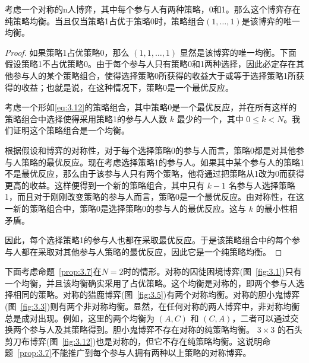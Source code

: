 \begin{proposition}\label{prop:3.7}
    考虑一个对称的n人博弈，其中每个参与人有两种策略，0和1。那么这个博弈存在纯策略均衡。当且仅当策略1占优于策略0时，策略组合$(1, \ldots, 1)$是该博弈的唯一均衡。
\end{proposition}

\begin{proof}
如果策略1占优策略0，那么 \((1,1,\ldots,1)\) 显然是该博弈的唯一均衡。下面假设策略1不占优策略0。由于每个参与人只有策略0和1两种选择，因此必定存在其他参与人的某个策略组合，使得选择策略0所获得的收益大于或等于选择策略1所获得的收益；也就是说，在这种情况下，策略0是一个最优反应。

考虑一个形如\eqref{eq:3.12}的策略组合，其中策略0是一个最优反应，并在所有这样的策略组合中选择使得采用策略1的参与人人数 \(k\) 最少的一个，其中 \(0\leq k<N\)。我们证明这个策略组合是一个均衡。

根据假设和博弈的对称性，对于每个选择策略0的参与人而言，策略0都是对其他参与人策略的最优反应。现在考虑选择策略1的参与人。如果其中某个参与人的策略1不是最优反应，那么由于该参与人只有两个策略，他将通过把策略从1改为0而获得更高的收益。这样便得到一个新的策略组合，其中只有 \(k-1\) 名参与人选择策略1，而且对于刚刚改变策略的参与人而言，策略0是一个最优反应。由对称性，在这一新的策略组合中，策略0是选择策略0的参与人的最优反应。这与 \(k\) 的最小性相矛盾。

因此，每个选择策略1的参与人也都在采取最优反应。于是该策略组合中的每个参与人都在采取对其他参与人策略的最优反应，因此它是一个纯策略均衡。
\end{proof}


下面考虑命题~\ref{prop:3.7}在\(N = 2\)时的情形。对称的囚徒困境博弈(图~\ref{fig:3.1})只有一个均衡，并且该均衡确实采用了占优策略。这个均衡是对称的，即两个参与人选择相同的策略。对称的猎鹿博弈(图~\ref{fig:3.5})有两个对称均衡。对称的胆小鬼博弈(图~\ref{fig:3.3})则有两个非对称均衡。显然，在任何对称的两人博弈中，非对称均衡总是成对出现。例如，这里的两个均衡为 \((A,C)\) 和 \((C,A)\)，二者可以通过交换两个参与人及其策略得到。胆小鬼博弈不存在对称的纯策略均衡。 \(3 \times 3\) 的石头剪刀布博弈(图~\ref{fig:3.12})也是对称的，但它不存在纯策略均衡。这说明命题~\ref{prop:3.7}不能推广到每个参与人拥有两种以上策略的对称博弈。
\begin{center}
\setlength{\fboxsep}{6pt}
\setlength{\fboxrule}{0.4pt}
\end{center}

